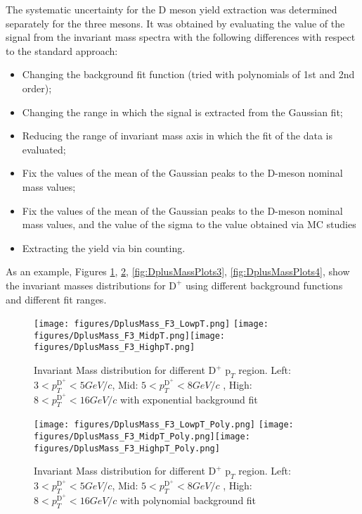 The systematic uncertainty for the D meson yield extraction was determined separately for the three mesons. It was obtained by evaluating the value of the signal from the invariant mass spectra with the following differences with respect to the standard approach:
\begin{itemize}
    \item Changing the background fit function (tried with polynomials of 1st and 2nd order);
    \item Changing the range in which the signal is extracted from the Gaussian fit;
    \item Reducing the range of invariant mass axis in which the fit of the data is evaluated;
    \item Fix the values of the mean of the Gaussian peaks to the D-meson nominal mass values;
    \item Fix the values of the mean of the Gaussian peaks to the D-meson nominal mass values, and the value of the sigma to the value obtained via MC studies
    \item Extracting the yield via bin counting.
\end{itemize}

As an example, Figures \ref{fig:DplusMassPlots1}, \ref{fig:DplusMassPlots2}, \ref{fig:DplusMassPlots3}, \ref{fig:DplusMassPlots4}, show the invariant masses distributions for  $\text{D}^+$ using different background functions and different fit ranges.

\begin{figure}
\centering
{\texttt{[image: figures/DplusMass\_F3\_LowpT.png]}}
{\texttt{[image: figures/DplusMass\_F3\_MidpT.png]}}{\texttt{[image: figures/DplusMass\_F3\_HighpT.png]}}
 \caption{Invariant Mass distribution for different $\text{D}^+$ $\text{p}_T$ region. Left: $3< p_{T}^{\text{D}^+}< 5 GeV/c$, Mid: $5< p_{T}^{\text{D}^+}< 8 GeV/c$ , High: $8< p_{T}^{\text{D}^+}< 16 GeV/c$ with exponential background fit }
\label{fig:DplusMassPlots1}
\end{figure}

\begin{figure}
\centering
{\texttt{[image: figures/DplusMass\_F3\_LowpT\_Poly.png]}}
{\texttt{[image: figures/DplusMass\_F3\_MidpT\_Poly.png]}}{\texttt{[image: figures/DplusMass\_F3\_HighpT\_Poly.png]}}
 \caption{Invariant Mass distribution for different $\text{D}^+$ $\text{p}_T$ region. Left: $3< p_{T}^{\text{D}^+}< 5 GeV/c$, Mid: $5< p_{T}^{\text{D}^+}< 8 GeV/c$ , High: $8< p_{T}^{\text{D}^+}< 16 GeV/c$ with polynomial background fit }
\label{fig:DplusMassPlots2}
\end{figure}


